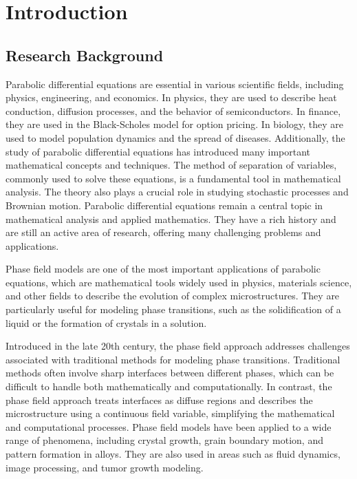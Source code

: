 \documentclass[a4paper, oneside]{book}
\begin{document}



%

%


\tableofcontents




\chapter{Introduction}




\section{Research Background}

Parabolic differential equations are essential in various scientific fields, including physics, engineering, and economics. In physics, they are used to describe heat conduction, diffusion processes, and the behavior of semiconductors. In finance, they are used in the Black-Scholes model for option pricing. In biology, they are used to model population dynamics and the spread of diseases.
Additionally, the study of parabolic differential equations has introduced many important mathematical concepts and techniques. The method of separation of variables, commonly used to solve these equations, is a fundamental tool in mathematical analysis. The theory also plays a crucial role in studying stochastic processes and Brownian motion.
Parabolic differential equations remain a central topic in mathematical analysis and applied mathematics. They have a rich history and are still an active area of research, offering many challenging problems and applications.

Phase field models are one of the most important applications of parabolic equations, which are mathematical tools widely used in physics, materials science, and other fields to describe the evolution of complex microstructures. They are particularly useful for modeling phase transitions, such as the solidification of a liquid or the formation of crystals in a solution.

Introduced in the late 20th century, the phase field approach addresses challenges associated with traditional methods for modeling phase transitions. Traditional methods often involve sharp interfaces between different phases, which can be difficult to handle both mathematically and computationally. In contrast, the phase field approach treats interfaces as diffuse regions and describes the microstructure using a continuous field variable, simplifying the mathematical and computational processes. Phase field models have been applied to a wide range of phenomena, including crystal growth, grain boundary motion, and pattern formation in alloys. They are also used in areas such as fluid dynamics, image processing, and tumor growth modeling.
\end{document}
